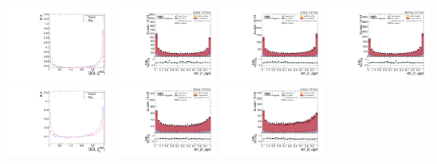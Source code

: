 \begin{figure}[!ht]
  \centering
  \includegraphics[width=0.24\textwidth]{analysis_plots/tmva_plots/zjj_BDTG14_vbf1_AK4_qgid.pdf}
  \includegraphics[width=0.24\textwidth]{analysis_plots/2016_zjj/cr_vjets_l/vbf_j1_qgid.pdf}
  \includegraphics[width=0.24\textwidth]{analysis_plots/2017_zjj/cr_vjets_l/vbf_j1_qgid.pdf}
  \includegraphics[width=0.24\textwidth]{analysis_plots/2018_zjj/cr_vjets_l/vbf_j1_qgid.pdf} \\
  \includegraphics[width=0.24\textwidth]{analysis_plots/tmva_plots/zjj_BDTG14_vbf2_AK4_qgid.pdf}
  \includegraphics[width=0.24\textwidth]{analysis_plots/2016_zjj/cr_vjets_l/vbf_j2_qgid.pdf}
  \includegraphics[width=0.24\textwidth]{analysis_plots/2017_zjj/cr_vjets_l/vbf_j2_qgid.pdf}

\end{figure}
